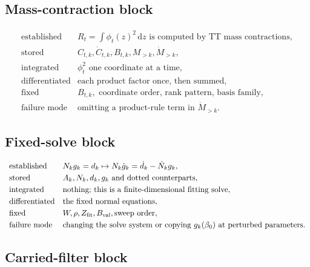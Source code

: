 \documentclass[11pt]{article}
\newcommand{\dd}{\,\mathrm d}
\begin{document}
\subsection*{Mass-contraction block}

\[
\begin{array}{ll}
\text{established} &
    R_t=\int\phi_t(z)^2\dd z
    \text{ is computed by TT mass contractions},\\[1mm]
\text{stored} &
    C_{t,k},\dot C_{t,k},B_{t,k},M_{>k},\dot M_{>k},\\[1mm]
\text{integrated} &
    \phi_t^2 \text{ one coordinate at a time},\\[1mm]
\text{differentiated} &
    \text{each product factor once, then summed},\\[1mm]
\text{fixed} &
    B_{t,k},\text{ coordinate order, rank pattern, basis family},\\[1mm]
\text{failure mode} &
    \text{omitting a product-rule term in } \dot M_{>k}.
\end{array}
\label{eq:p24-p22-r2}
\]

\subsection*{Fixed-solve block}

\[
\begin{array}{ll}
\text{established} &
    N_k g_k=d_k
    \mapsto
    N_k\dot g_k=\dot d_k-\dot N_k g_k,\\[1mm]
\text{stored} &
    A_k,N_k,d_k,g_k \text{ and dotted counterparts},\\[1mm]
\text{integrated} &
    \text{nothing; this is a finite-dimensional fitting solve},\\[1mm]
\text{differentiated} &
    \text{the fixed normal equations},\\[1mm]
\text{fixed} &
    W,\rho,Z_{\rm fit},B_{\rm val},\text{sweep order},\\[1mm]
\text{failure mode} &
    \text{changing the solve system or copying }g_k(\beta_0)
    \text{ at perturbed parameters.}
\end{array}
\label{eq:p24-p22-r3}
\]

\subsection*{Carried-filter block}
\end{document}
